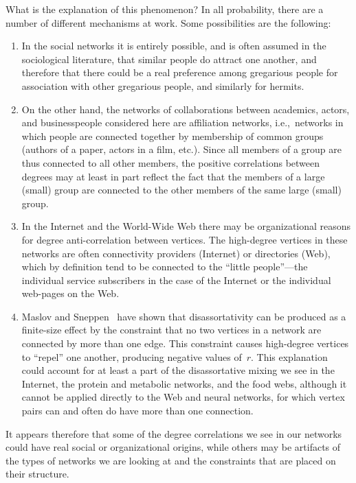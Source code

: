 \documentclass[twocolumn,pre]{revtex4}
\begin{document}
What is the explanation of this phenomenon?  In all probability, there are
a number of different mechanisms at work.  Some possibilities are the
following:
\begin{enumerate}
\item In the social networks it is entirely possible, and is often assumed
in the sociological literature, that similar people do attract one another,
and therefore that there could be a real preference among gregarious people
for association with other gregarious people, and similarly for hermits.
\item On the other hand, the networks of collaborations between academics,
actors, and businesspeople considered here are affiliation networks,
i.e.,~networks in which people are connected together by membership of
common groups (authors of a paper, actors in a film, etc.).  Since all
members of a group are thus connected to all other members, the positive
correlations between degrees may at least in part reflect the fact that the
members of a large (small) group are connected to the other members of the
same large (small) group.
\item In the Internet and the World-Wide Web there may be organizational
reasons for degree anti-correlation between vertices.  The high-degree
vertices in these networks are often connectivity providers (Internet) or
directories (Web), which by definition tend to be connected to the ``little
people''---the individual service subscribers in the case of the Internet
or the individual web-pages on the Web.
\item Maslov and Sneppen~\cite{MS02b} have shown that disassortativity can
be produced as a finite-size effect by the constraint that no two vertices
in a network are connected by more than one edge.  This constraint causes
high-degree vertices to ``repel'' one another, producing negative values
of~$r$.  This explanation could account for at least a part of the
disassortative mixing we see in the Internet, the protein and metabolic
networks, and the food webs, although it cannot be applied directly to the
Web and neural networks, for which vertex pairs can and often do have more
than one connection.
\end{enumerate}
It appears therefore that some of the degree correlations we see in our
networks could have real social or organizational origins, while others may
be artifacts of the types of networks we are looking at and the constraints
that are placed on their structure.
\end{document}

